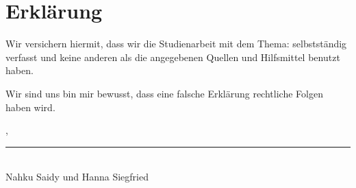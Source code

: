 
\thispagestyle{empty}

\section*{Erkl\"arung}
\vspace*{2em}

Wir versichern hiermit, dass wir die Studienarbeit mit dem Thema: {\itshape \titel} selbstst\"andig verfasst und keine anderen als die angegebenen Quellen und Hilfsmittel benutzt haben.

Wir sind uns bin mir bewusst, dass eine falsche Erklärung rechtliche Folgen haben wird.

\vspace{3em}

\abgabeort, \datumAbgabe
\vspace{4em}

\rule{6.8cm}{0.4pt}\\
Nahku Saidy und Hanna Siegfried
